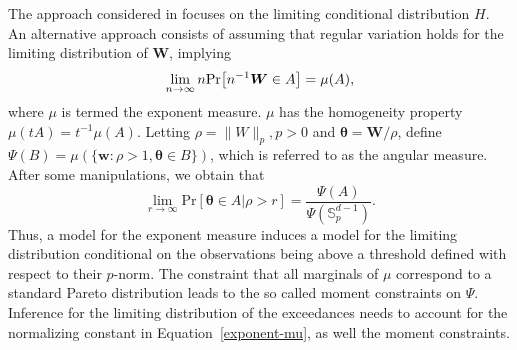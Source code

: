 The approach considered in \cite{rootzen2018} focuses on the limiting
    conditional distribution $H$. An alternative approach consists of assuming
    that regular variation \cite[see, for example,][]{resnick2008extreme} holds 
    for the limiting distribution of $\bm{W}$, implying
    \[
        \lim\limits_{n\rightarrow\infty} n \prob{n^{-1} \bm{W}\in A} = 
        \mu(A),
    \]
    where $\mu$ is termed the exponent measure. $\mu$ has the homogeneity property
    $\mu(tA) = t^{-1}\mu(A)$. Letting $\rho = \|W\|_p, p>0$ 
    and $\bm{\theta} = \bm{W}/\rho$, define  $\Psi(B) = \mu(\{\bm{w} : \rho>1, 
    \bm{\theta} \in B\})$, which is referred to as the angular measure. After 
    some manipulations, we obtain that
    \begin{equation}
    \label{exponent-mu}
        \lim\limits_{r\rightarrow\infty} 
        \text{Pr}\left[\bm{\theta}\in A \rvert \rho>r\right] = 
            \frac{\Psi(A)}{\Psi({\mathbb S}_p^{d-1})} .
    \end{equation}
    Thus, a model for the exponent measure induces a model for the limiting distribution
    conditional on the observations being above a threshold defined with respect
    to their $p$-norm. The constraint that all marginals of $\mu$ correspond to a
    standard Pareto distribution leads to the so called moment constraints on $\Psi$. 
    Inference for the limiting distribution of the exceedances
    needs to account for the normalizing constant in Equation~\eqref{exponent-mu}, as well
    the moment constraints. 
    

